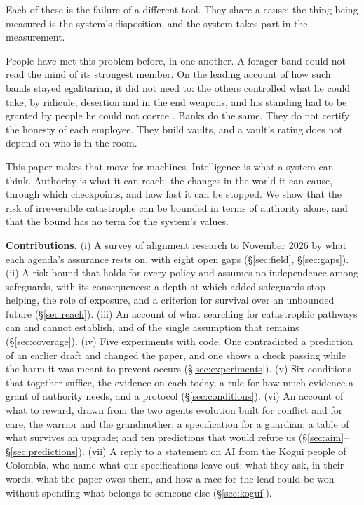 \documentclass[10pt,twocolumn,letterpaper]{article}
\theoremstyle{definition}
\newcommand{\para}[1]{\smallskip\noindent\textbf{#1}\enspace}
\begin{document}
Each of these is the failure of a different tool. They share a cause: the thing being measured is the system's disposition, and the system takes part in the measurement.

People have met this problem before, in one another. A forager band could not read the mind of its strongest member. On the leading account of how such bands stayed egalitarian, it did not need to: the others controlled what he could take, by ridicule, desertion and in the end weapons, and his standing had to be granted by people he could not coerce \cite{boehm1993,boehm1999,woodburn}. Banks do the same. They do not certify the honesty of each employee. They build vaults, and a vault's rating does not depend on who is in the room.

This paper makes that move for machines. Intelligence is what a system can think. Authority is what it can reach: the changes in the world it can cause, through which checkpoints, and how fast it can be stopped. We show that the risk of irreversible catastrophe can be bounded in terms of authority alone, and that the bound has no term for the system's values.

\para{Contributions.}
(i) A survey of alignment research to November 2026 by what each agenda's assurance rests on, with eight open gaps (\S\ref{sec:field}, \S\ref{sec:gaps}).
(ii) A risk bound that holds for every policy and assumes no independence among safeguards, with its consequences: a depth at which added safeguards stop helping, the role of exposure, and a criterion for survival over an unbounded future (\S\ref{sec:reach}).
(iii) An account of what searching for catastrophic pathways can and cannot establish, and of the single assumption that remains (\S\ref{sec:coverage}).
(iv) Five experiments with code. One contradicted a prediction of an earlier draft and changed the paper, and one shows a check passing while the harm it was meant to prevent occurs (\S\ref{sec:experiments}).
(v) Six conditions that together suffice, the evidence on each today, a rule for how much evidence a grant of authority needs, and a protocol (\S\ref{sec:conditions}).
(vi) An account of what to reward, drawn from the two agents evolution built for conflict and for care, the warrior and the grandmother; a specification for a guardian; a table of what survives an upgrade; and ten predictions that would refute us (\S\ref{sec:aim}--\S\ref{sec:predictions}).
(vii) A reply to a statement on AI from the Kogui people of Colombia, who name what our specifications leave out: what they ask, in their words, what the paper owes them, and how a race for the lead could be won without spending what belongs to someone else (\S\ref{sec:kogui}).
\end{document}
